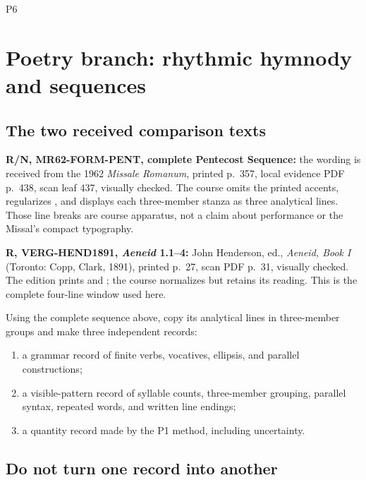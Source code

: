 \begin{courseunit}{P6}
\chapter{Poetry branch: rhythmic hymnody and sequences}

\section{The two received comparison texts}

\textbf{R/N, MR62-FORM-PENT, complete Pentecost Sequence:} the wording is
received from the 1962 \textit{Missale Romanum}, printed p.~357, local evidence
PDF p.~438, scan leaf 437, visually checked. The course omits the printed
accents, regularizes , and displays each three-member stanza as
three analytical lines. Those line breaks are course apparatus, not a claim
about performance or the Missal's compact typography.

\begin{quote}
\small
\PoetryPentecostSequenceComplete
\end{quote}

\textbf{R, VERG-HEND1891, \textit{Aeneid} 1.1--4:} John Henderson, ed.,
\textit{Aeneid, Book I} (Toronto: Copp, Clark, 1891), printed p.~27, scan PDF
p.~31, visually checked. The edition prints  and
; the course normalizes  but retains its
 reading. This is the complete four-line window used here.

\begin{quote}
\PoetryVirgilAeneidOpening
\end{quote}

Using the complete sequence above, copy its analytical lines in three-member
groups and make three independent records:

\begin{enumerate}
\item a grammar record of finite verbs, vocatives, ellipsis, and parallel
constructions;
\item a visible-pattern record of syllable counts, three-member grouping,
parallel syntax, repeated words, and written line endings;
\item a quantity record made by the P1 method, including uncertainty.
\end{enumerate}

\section{Do not turn one record into another}


\end{courseunit}
